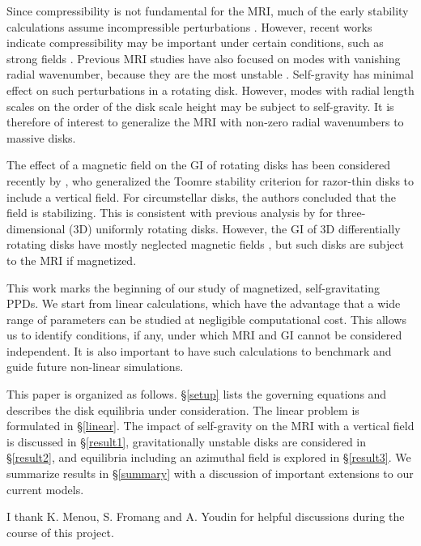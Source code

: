 \documentclass[iop]{emulateapj}
\begin{document}
Since compressibility is not fundamental for the MRI, much of the
early stability calculations assume incompressible perturbations
\citep{goodman94,jin96}. However, recent works indicate
compressibility may be important under certain conditions,
such as strong fields \citep{kim00, pessah05,bonanno07}.   
Previous MRI studies have also focused on modes with vanishing
radial wavenumber, because they are the most unstable
\citep{sano99,reyes01}. Self-gravity has minimal effect on such
perturbations in a rotating disk. However, modes
with radial length scales on the order of the disk scale height may be
subject to self-gravity. It is therefore of interest to generalize the MRI with
non-zero radial wavenumbers to massive disks. 



The effect of a magnetic field on the GI of rotating disks has been
considered recently by \cite{lizano10}, who generalized the Toomre stability
criterion for razor-thin disks to include a vertical field. For
circumstellar disks, the authors concluded that the field is
stabilizing. This is consistent with previous analysis by
\cite{nakamura83} for three-dimensional (3D) uniformly rotating
disks. However, the GI of 3D differentially rotating disks have
mostly neglected magnetic fields \citep{mamat10,kim12}, but such disks
are subject to the MRI if magnetized. 


This work marks the beginning of our study of magnetized,
self-gravitating PPDs. We start from linear calculations, which  
have the advantage that a wide range of parameters can be studied at
negligible computational cost. This  allows us to identify
conditions, if any, under which MRI and GI 
cannot be considered independent. It is also important to have such 
calculations to benchmark and guide future non-linear
simulations.   


This paper is organized as follows. \S\ref{setup} lists the governing
equations and describes the disk equilibria under consideration. 
The linear problem is formulated in \S\ref{linear}. The impact
of self-gravity on the MRI with a vertical field is discussed in
\S\ref{result1}, gravitationally unstable disks are considered in
\S\ref{result2}, and equilibria including an azimuthal field is explored in
\S\ref{result3}. We summarize results in \S\ref{summary} with a 
discussion of important extensions to our current models.





 


\acknowledgements
I thank K. Menou, S. Fromang and A. Youdin for helpful discussions
during the course of this project. 

\appendix




\end{document}
